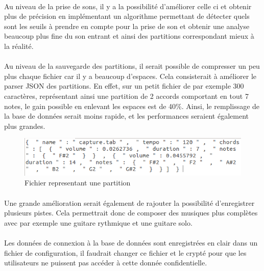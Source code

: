 \paragraph{}
Au niveau de la prise de sons, il y a la possibilité d'améliorer celle ci et obtenir plus de précision 
en implémentant un algorithme permettant de détecter quels sont les seuils à prendre en compte pour la prise de son 
et obtenir une analyse beaucoup plus fine du son entrant et ainsi des partitions correspondant mieux à la 
réalité. 
\paragraph{}
Au niveau de la sauvegarde des partitions, il serait possible de compresser un peu plus chaque fichier 
car il y a beaucoup d'espaces. Cela consisterait à améliorer le parser JSON des partitions. En effet, sur un petit fichier 
de par exemple 300 caractères, représentant ainsi une partition de 2 accords comportant en tout 7 notes, le gain 
possible en enlevant les espaces est de 40\%. Ainsi, le remplissage de la base de données serait moins rapide, 
et les performances seraient également plus grandes.

\begin{figure}[H]
\centering
\includegraphics[scale=0.5]{FichierPartition}
\caption{Fichier representant une partition}
\end{figure}


\paragraph{}
Une grande amélioration serait également de rajouter la possibilité d'enregistrer plusieurs pistes. Cela permettrait donc de 
composer des musiques plus complètes avec par exemple une guitare rythmique et une guitare solo.

\paragraph{}
Les données de connexion à la base de données sont enregistrées en clair dans un fichier de configuration, il faudrait changer 
ce fichier et le crypté pour que les utilisateurs ne puissent pas accéder à cette donnée confidentielle.

